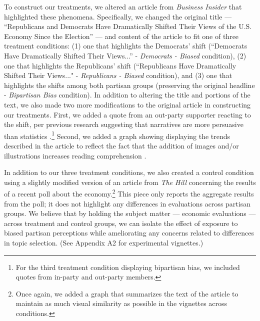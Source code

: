 \documentclass[12pt, letterpaper]{article}
\begin{document}
To construct our treatments, we altered an article from \textit{Business Insider} that highlighted these phenomena. Specifically, we changed the original title --- ``Republicans and Democrats Have Dramatically Shifted Their Views of the U.S. Economy Since the Election'' \citep{bi_2016} --- and content of the article to fit one of three treatment conditions: (1) one that highlights the Democrats' shift (``Democrats Have Dramatically Shifted Their Views...'' - \textit{Democrats - Biased} condition), (2) one that highlights the Republicans' shift (``Republicans Have Dramatically Shifted Their Views..." - \textit{Republicans - Biased} condition), and (3) one that highlights the shifts among both partisan groups (preserving the original headline - \textit{Bipartisan Bias} condition). In addition to altering the title and portions of the text, we also made two more modifications to the original article in constructing our treatments. First, we added a quote from an out-party supporter reacting to the shift, per previous research suggesting that narratives are more persuasive than statistics \citep{Kahneman2011}.\footnote{For the third treatment condition displaying bipartisan bias, we included quotes from in-party and out-party members.} Second, we added a graph showing displaying the trends described in the article to reflect the fact that the addition of images and/or illustrations increases reading comprehension \citep{gambrelljawitz_1993}. 

In addition to our three treatment conditions, we also created a control condition using a slightly modified version of an article from \textit{The Hill} concerning the results of a recent poll about the economy.\footnote{Once again, we added a graph that summarizes the text of the article to maintain as much visual similarity as possible in the vignettes across conditions.} This piece only reports the aggregate results from the poll; it does not highlight any differences in evaluations across partisan groups. We believe that by holding the subject matter --- economic evaluations --- across treatment and control groups, we can isolate the effect of exposure to biased partisan perceptions while ameliorating any concerns related to differences in topic selection. (See Appendix A2 for experimental vignettes.) 
\end{document}
